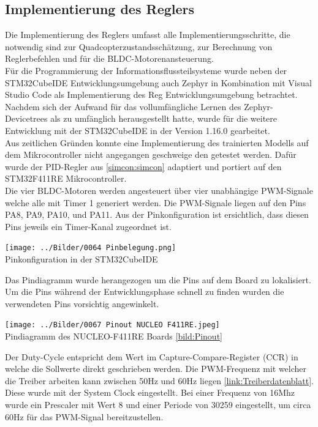 \subsection{\label{Reglerimplementierung:Reglerimplementierung}Implementierung des Reglers}
Die Implementierung des Reglers umfasst alle Implementierungsschritte, die notwendig sind zur Quadcopterzustandsschätzung, zur Berechnung von Reglerbefehlen und für die BLDC-Motorenansteuerung.\\
Für die Programmierung der Informationsflussteilsysteme wurde neben der STM32CubeIDE Entwicklungsumgebung auch Zephyr in Kombination mit Visual Studio Code als Implementierung des Reg Entwicklungsumgebung betrachtet. Nachdem sich der Aufwand für das vollumfängliche Lernen des Zephyr-Devicetrees als zu umfänglich herausgestellt hatte, wurde für die weitere Entwicklung mit der STM32CubeIDE in der Version 1.16.0 gearbeitet.\\
Aus zeitlichen Gründen konnte eine Implementierung des trainierten Modells auf dem Mikrocontroller nicht angegangen geschweige den getestet werden. Dafür wurde der PID-Regler aus \ref{simcon:simcon} adaptiert und portiert auf den STM32F411RE Mikrocontroller. \\
Die vier BLDC-Motoren werden angesteuert über vier unabhängige PWM-Signale welche alle mit Timer 1 generiert werden. Die PWM-Signale liegen auf den Pins PA8, PA9, PA10, und PA11. Aus der Pinkonfiguration ist ersichtlich, dass diesen Pins jeweils ein Timer-Kanal zugeordnet ist. 
\begin{center}
	\texttt{[image: ../Bilder/0064 Pinbelegung.png]}{\\Pinkonfiguration in der STM32CubeIDE}
\end{center}
Das Pindiagramm wurde herangezogen um die Pins auf dem Board zu lokalisiert. Um die Pins während der Entwicklungsphase schnell zu finden wurden die verwendeten Pins vorsichtig angewinkelt.
\begin{center}
	\texttt{[image: ../Bilder/0067 Pinout NUCLEO F411RE.jpeg]}{\\Pindiagramm des NUCLEO-F411RE Boards \ref{bild:Pinout}}
\end{center}
Der Duty-Cycle entspricht dem Wert im Capture-Compare-Register (CCR) in welche die Sollwerte direkt geschrieben werden. Die PWM-Frequenz mit welcher die Treiber arbeiten kann zwischen 50Hz und 60Hz liegen \ref{link:Treiberdatenblatt}. Diese wurde mit der System Clock eingestellt. Bei einer Frequenz von 16Mhz wurde ein Prescaler mit Wert 8 und einer Periode von 30259 eingestellt, um circa 60Hz für das PWM-Signal bereitzustellen.
